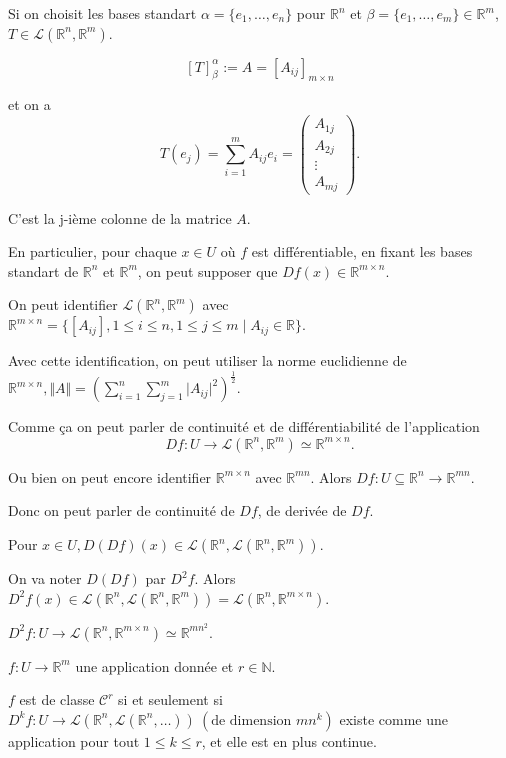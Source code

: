 \documentclass[french]{article}
\begin{document}
Si on choisit les bases standart $\alpha = \{ e_1, \dots, e_n \} $ pour $ \mathbb{R}^n$ et $ \beta = \{ e_1, \dots, e_m \} \in \mathbb{R}^m $, $T \in \mathscr{L}(\mathbb{R}^n, \mathbb{R}^m) $.

$$ [T] _{\beta } ^{\alpha} := A = [A _{ij}] _{m \times n}$$

et on a $$ T(e_j) = \sum_{i=1}^{m} A _{ij} e_i  = \begin{pmatrix}
  A _{1j} \\
  A _{2j} \\
  \vdots \\
  A _{mj}
\end{pmatrix}.$$

C'est la j-ième colonne de la matrice $A$.

En particulier, pour chaque $x \in U$ où $f$ est différentiable, en fixant les bases standart de $\mathbb{R}^n$ et $\mathbb{R}^m$, on peut supposer que $Df(x) \in \mathbb{R} ^{m \times n}$.

On peut identifier $\mathscr{L}(\mathbb{R}^n, \mathbb{R}^m) $ avec $\mathbb{R} ^{m \times n} = \{ [A _{ij}], 1 \leq i \leq n, 1 \leq j \leq m \mid A _{ij} \in \mathbb{R}\} $.

Avec cette identification, on peut utiliser la norme euclidienne de $\mathbb{R} ^{m \times n}, \Vert A \Vert = \left( \sum_{i=1}^{n} \sum_{j=1}^{m} \lvert A _{ij} \rvert ^2 \right) ^{\frac{1}{2}}  $.

Comme ça on peut parler de continuité et de différentiabilité de l'application $$Df : U \to \mathscr{L}(\mathbb{R}^n, \mathbb{R}^m) \simeq \mathbb{R}^{m\times n}.$$

Ou bien on peut encore identifier $\mathbb{R} ^{m \times n}$ avec $\mathbb{R} ^{mn}$. Alors $Df : U \subseteq \mathbb{R}^n \to \mathbb{R} ^{mn}$.

Donc on peut parler de continuité de $Df $, de derivée de $Df$.

Pour $x \in U, D(Df)(x) \in \mathscr{L}(\mathbb{R}^n, \mathscr{L}(\mathbb{R}^n, \mathbb{R}^m) ) $.

On va noter $D(Df)$ par $D ^2f$. Alors $D ^2 f (x) \in \mathscr{L}(\mathbb{R}^n, \mathscr{L}(\mathbb{R}^n, \mathbb{R}^m) ) = \mathscr{L}(\mathbb{R}^n, \mathbb{R}^{m\times n})  $.

$D ^2 f : U \to \mathscr{L}(\mathbb{R}^n, \mathbb{R} ^{m \times n}) \simeq \mathbb{R} ^{mn ^2} $.

\begin{thm}
  $f : U \to \mathbb{R}^m$ une application donnée et $r \in \mathbb{N}$.

  $f$ est de classe $\mathcal{C}^r$ si et seulement si $D ^{k} f : U \to \mathscr{L}(\mathbb{R}^n, \mathscr{L}(\mathbb{R}^n, \dots) ) \ (\text{de dimension } mn ^{k}) $ existe comme une application pour tout $1 \leq  k \leq r$, et elle est en plus continue.
\end{thm}
\end{document}
